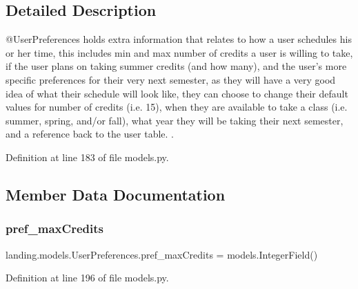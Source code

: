 \subsection{Detailed Description}
\begin{DoxyVerb}@UserPreferences  holds extra information that relates to how a
                user schedules his or her time, this includes
                min and max number of credits a user is willing to take,
                if the user plans on taking summer credits (and how many),
                and the user's more specific preferences for their very next
                semester, as they will have a very good idea of what their schedule
                will look like, they can choose to change their default values for
                number of credits (i.e. 15), when they are available to take a class (i.e. summer, spring, and/or fall),
                what year they will be taking their next semester, and a reference back to the user table.               .
\end{DoxyVerb}
 

Definition at line 183 of file models.\+py.



\subsection{Member Data Documentation}
\mbox{\label{classlanding_1_1models_1_1UserPreferences_a01a3066ef3e14f95e7749494de25e698}} 
\subsubsection{\texorpdfstring{pref\+\_\+max\+Credits}{pref\_maxCredits}}
{\footnotesize\ttfamily landing.\+models.\+User\+Preferences.\+pref\+\_\+max\+Credits = models.\+Integer\+Field()\hspace{0.3cm}{\ttfamily [static]}}



Definition at line 196 of file models.\+py.

\mbox{\label{classlanding_1_1models_1_1UserPreferences_a7f5982f807cfd77d3e54369e807cbbbf}} 
